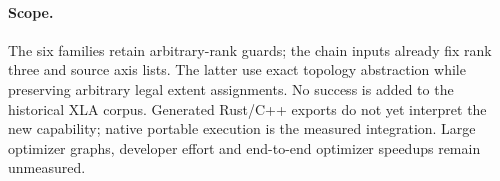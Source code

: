 \paragraph{Scope.}
The six families retain arbitrary-rank guards; the chain inputs already fix
rank three and source axis lists. The latter use exact topology abstraction
while preserving arbitrary legal extent assignments. No success is added to
the historical XLA corpus. Generated Rust/C++ exports do not yet interpret the
new capability; native portable execution is the measured integration. Large
optimizer graphs, developer effort and end-to-end optimizer speedups remain
unmeasured.
